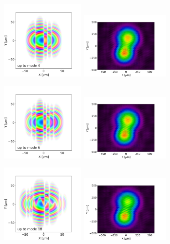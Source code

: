 \documentclass{iucr}              %
\begin{document}
\begin{figure}
\includegraphics[width=0.375\textwidth]{Figures/interference_D_uptomode0004_csd.png}
\includegraphics[width=0.4\textwidth]{Figures/interference_D_uptomode0004_pattern.png}

\includegraphics[width=0.375\textwidth]{Figures/interference_D_uptomode0006_csd.png}
\includegraphics[width=0.4\textwidth]{Figures/interference_D_uptomode0006_pattern.png}

\includegraphics[width=0.375\textwidth]{Figures/interference_D_uptomode0018_csd.png}
\includegraphics[width=0.4\textwidth]{Figures/interference_D_uptomode0018_pattern.png}


\end{figure}
\end{document}
